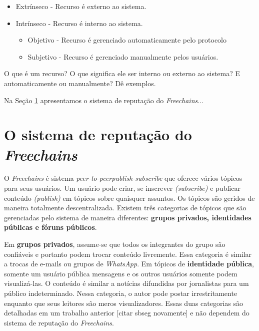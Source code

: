 \documentclass[12pt]{article}
\newcommand{\FC} {\emph{Freechains}\xspace}
\newcommand{\PtoP} {\emph{peer-to-peer}\xspace}
\begin{document}
\begin{itemize}
    \item Extrínseco - Recurso é externo ao sistema.
    \item Intrínseco - Recurso é interno ao sistema.
    \begin{itemize}
        \item Objetivo - Recurso é gerenciado automaticamente pelo protocolo
        \item Subjetivo - Recurso é gerenciado manualmente pelos usuários.
    \end{itemize}
\end{itemize}

O que é um recurso?
O que significa ele ser interno ou externo ao sistema?
E automaticamente ou manualmente?
Dê exemplos.

Na Seção \ref{sec:freechains} apresentamos o sistema de reputação do \FC...

\section{O sistema de reputação do \FC} \label{sec:freechains}

O \FC é sistema \PtoP \emph{publish-subscribe} que oferece vários tópicos para seus usuários. %
Um usuário pode criar, se inscrever \emph{(subscribe)} e publicar conteúdo \emph{(publish)} em tópicos sobre quaisquer assuntos.  Os tópicos são geridos de maneira totalmente descentralizada.
Existem três categorias de tópicos que são gerenciadas pelo sistema de maneira diferentes: \textbf{grupos privados, identidades públicas e fóruns públicos}. 

Em \textbf{grupos privados}, assume-se que todos os integrantes do grupo são confiáveis e portanto podem trocar conteúdo livremente.  Essa categoria é similar a trocas de e-mails ou grupos de \emph{WhatsApp}.
Em tópicos de \textbf{identidade pública}, somente um usuário pública mensagens e os outros usuários somente podem visualizá-las.
O conteúdo é similar a notícias difundidas por jornalistas para um público indeterminado. %
Nessa categoria, o autor pode postar irrestritamente enquanto que seus leitores são meros visualizadores. %
Essas duas categorias são detalhadas em um trabalho anterior [citar sbseg novamente] e não dependem do sistema de reputação do \FC.
\end{document}
